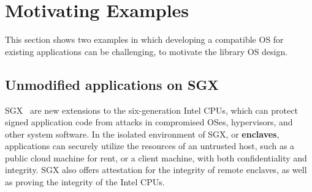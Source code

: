\section{Motivating Examples}

This section shows two examples in which developing a compatible OS for existing applications can be challenging, to motivate the library OS design.


\subsection{Unmodified applications on SGX}
\label{sec:intro:sgx}


SGX~\cite{intelsgx} are new extensions to the six-generation Intel CPUs,
which can
protect signed application code from attacks in compromised OSes, hypervisors, and other system software.
In the isolated environment of SGX, or {\bf enclaves}, applications can securely utilize the
resources of an untrusted host,
such as a public cloud machine for rent, or a client machine,
with both confidentiality and integrity.
SGX also offers attestation for the integrity of remote enclaves, as well as proving the integrity of the Intel CPUs.



